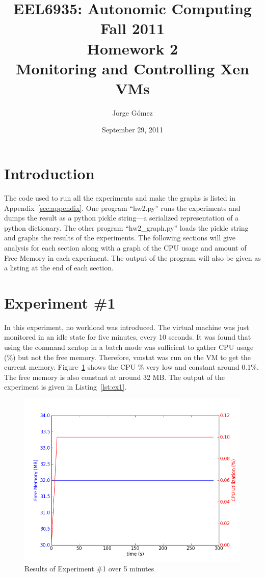 \documentclass{article}
\title{EEL6935: Autonomic Computing  Fall 2011\\Homework 2\\Monitoring and
Controlling Xen VMs}
\date{September 29, 2011}
\author{Jorge G\'omez}
\begin{document}
\maketitle
\tableofcontents
\section{Introduction}
  The code used to run all the experiments and make the graphs is listed
  in Appendix~\ref{sec:appendix}. One program ``hw2.py'' runs the
  experiments and dumps the result as a python pickle string---a
  serialized representation of a python dictionary. The other program
  ``hw2\_graph.py'' loads the pickle string and graphs the results of
  the experiments. The following sections will give analysis for each
  section along with a graph of the CPU usage and amount of Free Memory
  in each experiment. The output of the program will also be given as a
  listing at the end of each section.

\section{Experiment \#1}
  In this experiment, no workload was introduced. The virtual machine
  was just monitored in an idle state for five minutes, every 10
  seconds. It was found that using the command xentop in a batch mode
  was sufficient to gather CPU usage (\%) but not the free memory.
  Therefore, vmstat was run on the VM to get the current memory.
  Figure~\ref{fig:ex1} shows the CPU \% very low and constant around 0.1\%.
  The free memory is also constant at around 32 MB. The output of the
  experiment is given in Listing~\ref{lst:ex1}.

  \begin{figure}
    \begin{center}
      \includegraphics[scale=0.50]{ex1.png} 
      \caption{Results of Experiment \#1 over 5 minutes}
      \label{fig:ex1}
    \end{center}
  \end{figure}
\end{document}
